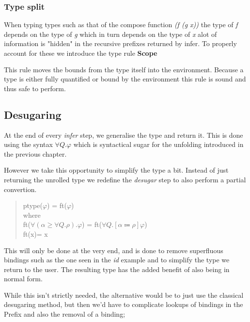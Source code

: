 \documentclass[12pt, a4paper, oneside]{article}
\begin{document}
\subsubsection{Type split}
When typing types such as that of the compose function \emph{(f (g x))} the type of \emph{f} depends on the type of \emph{g} which in turn depends on the type of \emph{x} alot of information is "hidden" in the recursive prefixes returned by infer. To properly account for these we introduce the type rule \textbf{Scope}

\begin{prooftree}
\end{prooftree}

This rule moves the bounds from the type itself into the environment. Because a type is either fully quantified or bound by the environment this rule is sound and thus safe to perform.

\subsection{Desugaring}
At the end of every \emph{infer} step, we generalise the type and return it. This is done using the syntax $\forall Q. \varphi$ which is syntactical sugar for the unfolding introduced in the previous chapter.

However we take this opportunity to simplify the type a bit. Instead of just returning the unrolled type we redefine the \emph{desugar} step to also perform a partial convertion. 

\begin{quotation}
\noindent ptype($\varphi$) = ft($\varphi$)\\
\indent\indent where \\
          \indent\indent\indent ft($\forall(\alpha \geq \forall Q. \rho). \varphi$) = ft($\forall Q.[\alpha \Coloneqq \rho]\varphi $)\\
          \indent\indent\indent ft(x)\indent\indent\indent\indent  = x\\
\end{quotation}
This will only be done at the very end, and is done to remove superfluous bindings such as the one seen in the \emph{id} example and to simplify the type we return to the user. The resulting type has the added benefit of also being in normal form.

While this isn't strictly needed, the alternative would be to just use the classical desugaring method, but then we'd have to complicate lookups of bindings in the Prefix and also the removal of a binding;
\end{document}
